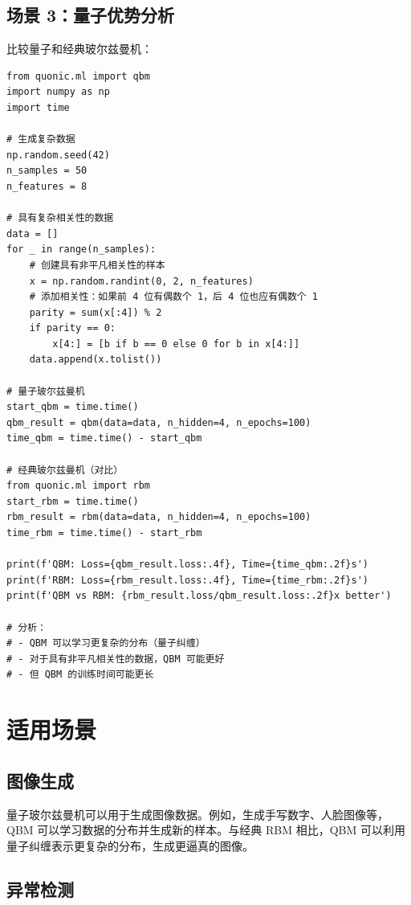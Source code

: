 \documentclass[12pt,a4paper]{article}
\begin{document}
\subsection{场景 3：量子优势分析}

比较量子和经典玻尔兹曼机：

\begin{verbatim}
from quonic.ml import qbm
import numpy as np
import time

# 生成复杂数据
np.random.seed(42)
n_samples = 50
n_features = 8

# 具有复杂相关性的数据
data = []
for _ in range(n_samples):
    # 创建具有非平凡相关性的样本
    x = np.random.randint(0, 2, n_features)
    # 添加相关性：如果前 4 位有偶数个 1，后 4 位也应有偶数个 1
    parity = sum(x[:4]) % 2
    if parity == 0:
        x[4:] = [b if b == 0 else 0 for b in x[4:]]
    data.append(x.tolist())

# 量子玻尔兹曼机
start_qbm = time.time()
qbm_result = qbm(data=data, n_hidden=4, n_epochs=100)
time_qbm = time.time() - start_qbm

# 经典玻尔兹曼机（对比）
from quonic.ml import rbm
start_rbm = time.time()
rbm_result = rbm(data=data, n_hidden=4, n_epochs=100)
time_rbm = time.time() - start_rbm

print(f'QBM: Loss={qbm_result.loss:.4f}, Time={time_qbm:.2f}s')
print(f'RBM: Loss={rbm_result.loss:.4f}, Time={time_rbm:.2f}s')
print(f'QBM vs RBM: {rbm_result.loss/qbm_result.loss:.2f}x better')

# 分析：
# - QBM 可以学习更复杂的分布（量子纠缠）
# - 对于具有非平凡相关性的数据，QBM 可能更好
# - 但 QBM 的训练时间可能更长
\end{verbatim}

\section{适用场景}

\subsection{图像生成}

量子玻尔兹曼机可以用于生成图像数据。例如，生成手写数字、人脸图像等，QBM 可以学习数据的分布并生成新的样本。与经典 RBM 相比，QBM 可以利用量子纠缠表示更复杂的分布，生成更逼真的图像。

\subsection{异常检测}
\end{document}
